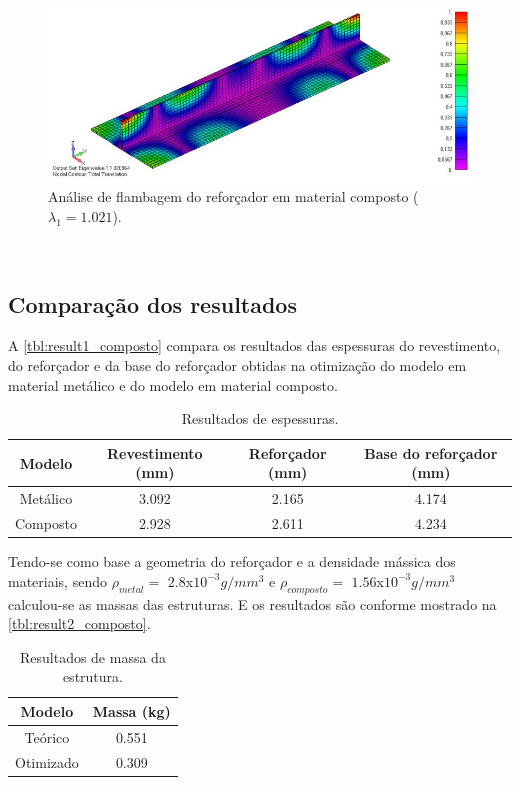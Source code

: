 \begin{figure}[ht]
 \caption{\label{fig_Result2Composite}Análise de flambagem do reforçador em material composto ($\lambda_1 = 1.021$).}
 \centering
 \includegraphics[scale=0.85]{figura/Results2_Composite}
\end{figure}
\

\subsection{Comparação dos resultados}

A \autoref{tbl:result1_composto} compara os resultados das espessuras do revestimento, do reforçador e da base do reforçador obtidas na otimização do modelo em material metálico e do modelo em material composto.
\begin{table}[h]
\centering
\begin{tabular}{cccc}
\toprule
Modelo & Revestimento (mm) & Reforçador (mm) & Base do reforçador (mm) \\\midrule
Metálico & 3.092 & 2.165 & 4.174 \\
Composto & 2.928 & 2.611 & 4.234\\
\bottomrule
\end{tabular}
\caption{Resultados de espessuras.}
\label{tbl:result1_composto}
\end{table}

Tendo-se como base a geometria do reforçador e a densidade mássica dos materiais, sendo $\rho_{metal} =$ $2.8$x$10^{-3} g/mm^3$ e $\rho_{composto} =$ $1.56$x$10^{-3} g/mm^3$ calculou-se as massas das estruturas. E os resultados são conforme mostrado na \autoref{tbl:result2_composto}.

\begin{table}[h]
\centering
\begin{tabular}{cc}
\toprule
Modelo & Massa (kg) \\ \midrule
Teórico & 0.551\\
Otimizado & 0.309\\
\bottomrule
\end{tabular}
\caption{Resultados de massa da estrutura.}
\label{tbl:result2_composto}
\end{table}

